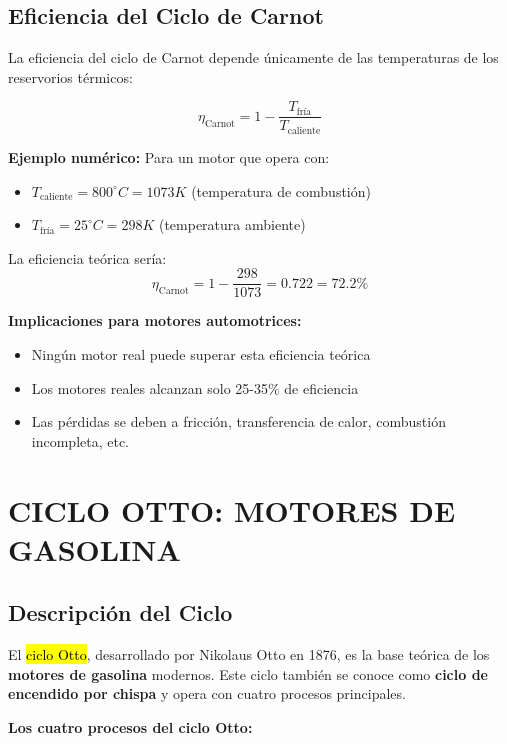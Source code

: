 \documentclass{article}
\begin{document}
\subsection*{Eficiencia del Ciclo de Carnot}

La eficiencia del ciclo de Carnot depende únicamente de las temperaturas de los reservorios térmicos:

$$\eta_{\text{Carnot}} = 1 - \frac{T_{\text{fría}}}{T_{\text{caliente}}}$$

\textbf{Ejemplo numérico:}
Para un motor que opera con:
\begin{itemize}
    \item $T_{\text{caliente}} = 800^\circ C = 1073 K$ (temperatura de combustión)
    \item $T_{\text{fría}} = 25^\circ C = 298 K$ (temperatura ambiente)
\end{itemize}

La eficiencia teórica sería:
$$\eta_{\text{Carnot}} = 1 - \frac{298}{1073} = 0.722 = 72.2\%$$

\textbf{Implicaciones para motores automotrices:}
\begin{itemize}
    \item Ningún motor real puede superar esta eficiencia teórica
    \item Los motores reales alcanzan solo 25-35\% de eficiencia
    \item Las pérdidas se deben a fricción, transferencia de calor, combustión incompleta, etc.
\end{itemize}

\vspace{5mm}

\section*{CICLO OTTO: MOTORES DE GASOLINA}

\subsection*{Descripción del Ciclo}

El \hl{ciclo Otto}, desarrollado por Nikolaus Otto en 1876, es la base teórica de los \textbf{motores de gasolina} modernos. Este ciclo también se conoce como \textbf{ciclo de encendido por chispa} y opera con cuatro procesos principales.

\textbf{Los cuatro procesos del ciclo Otto:}
\end{document}
